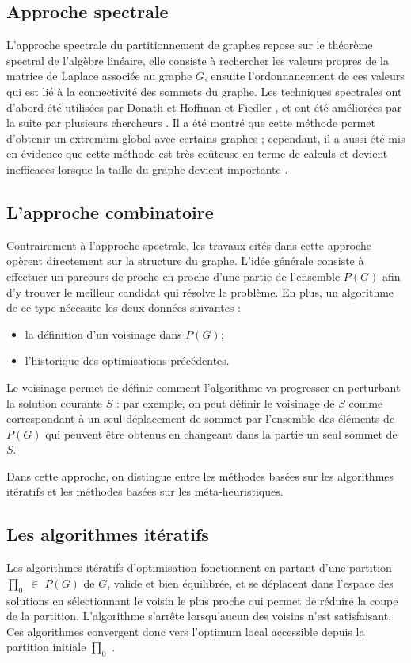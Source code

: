 \subsection*{Approche spectrale}
L'approche spectrale du partitionnement de graphes repose sur le théorème spectral de l'algèbre linéaire, elle consiste à rechercher les valeurs propres de la matrice de Laplace associée au graphe $G$, ensuite l'ordonnancement de ces valeurs qui est lié à la connectivité des sommets du graphe.
Les techniques spectrales ont d'abord été utilisées par Donath et Hoffman \citep{DonathHoffman1972} et Fiedler \citep{Fiedler1973,Fiedler1975}, et ont été améliorées par la suite par plusieurs chercheurs \citep{Boppana1987,HendricksonLeland1995a,Kabelikova2006,Simon1991}.
Il a été montré que cette méthode permet d'obtenir un extremum global avec certains graphes \citep{Pothen1990}; cependant, il a aussi été mis en évidence que cette méthode est très coûteuse en terme de calculs et devient inefficaces lorsque la taille du graphe devient importante \citep{BarnardSimon1994}.

\subsection*{L'approche combinatoire} \citep{BENSETIRA2017}
Contrairement à l'approche spectrale, les travaux cités dans cette approche opèrent directement sur la structure du graphe.
L'idée générale consiste à effectuer un parcours de proche en proche d'une partie de l'ensemble $P(G)$ afin d'y trouver le meilleur candidat qui résolve le problème. En plus, un algorithme de ce type nécessite les deux données suivantes :
\begin{itemize}
\item la définition d'un voisinage dans $P(G)$;
\item l'historique des optimisations précédentes.
\end{itemize}
Le voisinage permet de définir comment l'algorithme va progresser en perturbant la solution courante $S$ : par exemple, on peut définir le voisinage de $S$ comme correspondant à un seul déplacement de sommet par l'ensemble des éléments de $P(G)$ qui peuvent être obtenus en changeant dans la partie un seul sommet de $S$.

Dans cette approche, on distingue entre les méthodes basées sur les algorithmes itératifs et les méthodes basées sur les méta-heuristiques.

\subsection*{Les algorithmes itératifs}
Les algorithmes itératifs d'optimisation fonctionnent en partant d'une partition $\prod _0 \;\in \; P(G)$ de $G$, valide et bien équilibrée, et se déplacent dans l'espace des solutions en sélectionnant le voisin le plus proche qui permet de réduire la coupe de la partition. L'algorithme s'arrête lorsqu'aucun des voisins n'est satisfaisant. Ces algorithmes convergent donc vers l'optimum local accessible depuis la partition initiale $\prod _0$ .

